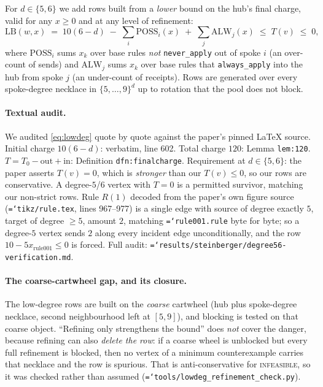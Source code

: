 \documentclass[11pt]{article}
\theoremstyle{definition}
\newcommand{\art}[1]{{\texttt{\hyphenchar\font=`\-\relax #1}}}
\begin{document}
For $d\in\{5,6\}$ we add rows built from a \emph{lower} bound on the hub's final
charge, valid for any $x\ge 0$ and at any level of refinement:
\begin{equation}
\label{eq:lowdeg}
  \mathrm{LB}(w,x) \;=\; 10(6-d) \;-\; \sum_i \mathrm{POSS}_i(x) \;+\; \sum_j \mathrm{ALW}_j(x)
  \;\le\; T(v) \;\le\; 0,
\end{equation}
where $\mathrm{POSS}_i$ sums $x_k$ over base rules \emph{not} \texttt{never\_apply}
out of spoke $i$ (an over-count of sends) and $\mathrm{ALW}_j$ sums $x_k$ over base
rules that \texttt{always\_apply} into the hub from spoke $j$ (an under-count of
receipts). Rows are generated over every spoke-degree necklace in $\{5,\dots,9\}^d$
up to rotation that the pool does not block.

\paragraph{Textual audit.} We audited \eqref{eq:lowdeg} quote by quote against the
paper's pinned LaTeX source. Initial charge $10(6-d)$: verbatim, line 602. Total
charge $120$: Lemma \texttt{lem:120}. $T = T_0 - \text{out} + \text{in}$: Definition
\texttt{dfn:finalcharge}. Requirement at $d\in\{5,6\}$: the paper asserts $T(v)=0$,
which is \emph{stronger} than our $T(v)\le 0$, so our rows are conservative. A
degree-$5$/$6$ vertex with $T=0$ is a permitted survivor, matching our non-strict
rows. Rule $R(1)$ decoded from the paper's own figure source
(\art{tikz/rule.tex}, lines 967--977) is a single edge with source of degree exactly
$5$, target of degree $\ge 5$, amount $2$, matching \art{rule001.rule} byte for byte;
so a degree-$5$ vertex sends $2$ along every incident edge unconditionally, and the
row $10 - 5x_{\text{rule001}} \le 0$ is forced. Full audit:
\art{results/steinberger/degree56-verification.md}.

\paragraph{The coarse-cartwheel gap, and its closure.} The low-degree rows are built
on the \emph{coarse} cartwheel (hub plus spoke-degree necklace, second neighbourhood
left at $[5,9]$), and blocking is tested on that coarse object. ``Refining only
strengthens the bound'' does \emph{not} cover the danger, because refining can also
\emph{delete the row}: if a coarse wheel is unblocked but every full refinement is
blocked, then no vertex of a minimum counterexample carries that necklace and the row
is spurious. That is anti-conservative for \textsc{infeasible}, so it was checked
rather than assumed (\art{tools/lowdeg\_refinement\_check.py}).
\end{document}
